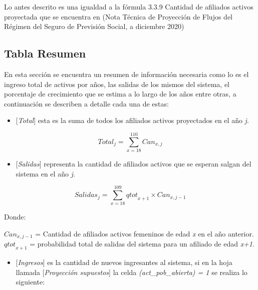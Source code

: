 \documentclass[
  letterpaper,
  DIV=11,
  numbers=noendperiod]{scrreprt}
\providecommand{\tightlist}{%
  \setlength{\itemsep}{0pt}\setlength{\parskip}{0pt}}\usepackage{longtable,booktabs,array}
\begin{document}
Lo antes descrito es una igualdad a la fórmula 3.3.9 Cantidad de
afiliados activos proyectada que se encuentra en (Nota Técnica de
Proyección de Flujos del Régimen del Seguro de Previsión Social, a
diciembre 2020)

\hypertarget{tabla-resumen}{%
\subsection{Tabla Resumen}\label{tabla-resumen}}

En esta sección se encuentra un resumen de información necesaria como lo
es el ingreso total de activos por años, las salidas de los mismos del
sistema, el porcentaje de crecimiento que se estima a lo largo de los
años entre otras, a continuación se describen a detalle cada una de
estas:

\begin{itemize}
\tightlist
\item
  {[}\emph{Total}{]} esta es la suma de todos los afiliados activos
  proyectados en el año \emph{j}.
\end{itemize}

\begin{equation}    
    Total_j=\sum_{x=18}^{110}{C{an}_{x,j}}
 \label{eq:totalactivos}
\end{equation}

\begin{itemize}
\tightlist
\item
  {[}\emph{Salidas}{]} representa la cantidad de afiliados activos que
  se esperan salgan del sistema en el año \emph{j}.
\end{itemize}

\begin{equation}    
Salidas_j=\sum_{x=18}^{109}{{qtot}_{x+1}\times{Can}_{x,j-1}}
 \label{eq:salidasact}
\end{equation}

Donde:

\({Can}_{x,j-1}\) = Cantidad de afiliados activos femeninos de edad
\emph{x} en el año anterior.\\
\({qtot}_{x+1}\) = probabilidad total de salidas del sistema para un
afiliado de edad \emph{x+1}.

\begin{itemize}
\tightlist
\item
  {[}\emph{Ingresos}{]} es la cantidad de nuevos ingresantes al sistema,
  si en la hoja llamada {[}\emph{Proyección supuestos}{]} la celda
  \emph{(act\_pob\_abierta) = 1} se realiza lo siguiente:
\end{itemize}
\end{document}
